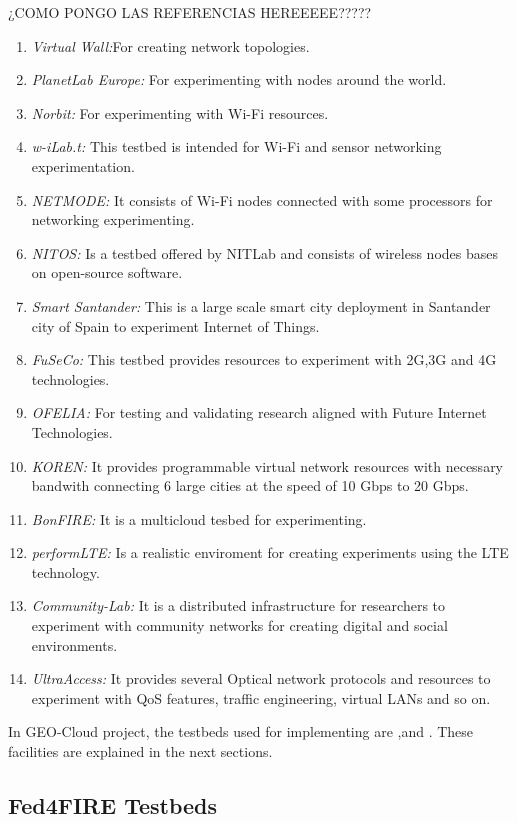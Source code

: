 ¿COMO PONGO LAS REFERENCIAS HEREEEEE?????
\begin{enumerate}
\item \emph{Virtual Wall:}For creating network topologies. 
\item \emph{PlanetLab Europe:} For experimenting with nodes around the world.
\item \emph{Norbit:} For experimenting with Wi-Fi resources.
\item \emph{w-iLab.t:} This testbed is intended for Wi-Fi and sensor networking experimentation.
\item \emph{NETMODE:} It consists of Wi-Fi nodes connected with some processors
  for networking experimenting.
\item \emph{NITOS:} Is a testbed offered by NITLab and consists of wireless
  nodes bases on open-source software. 
\item \emph{Smart Santander:} This is a large scale smart city deployment in
  Santander city of Spain to experiment Internet of Things. 
\item \emph{FuSeCo:} This testbed provides resources to experiment with 2G,3G
  and 4G technologies.
\item \emph{OFELIA:} For testing and validating research aligned
  with Future Internet Technologies.
\item \emph{KOREN:} It provides programmable virtual network resources with
  necessary bandwith connecting 6 large cities at the speed of 10 Gbps to 20 Gbps. 
\item \emph{BonFIRE:} It is a multicloud tesbed for experimenting.
\item \emph{performLTE:} Is a realistic enviroment for creating experiments
  using the LTE technology.
\item \emph{Community-Lab:} It is a distributed infrastructure for researchers
  to experiment with community networks for creating digital and social environments.
\item \emph{UltraAccess:} It provides several Optical network protocols and
  resources to experiment with QoS features, traffic engineering, virtual LANs
  and so on.
\end{enumerate}

In GEO-Cloud project, the testbeds used for implementing are \vw,\pl and
\bonfire. These facilities are explained in the next sections.

\subsection{Fed4FIRE Testbeds}

